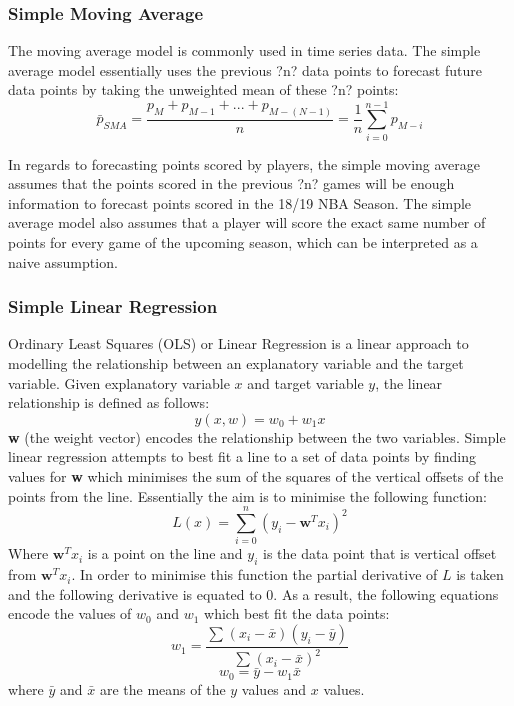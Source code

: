 \documentclass[a4paper,11pt,twoside]{article}
\begin{document}
\subsubsection{Simple Moving Average}
The moving average model is commonly used in time series data. The simple average model essentially uses the previous ?n? data points to forecast future data points by taking the unweighted mean of these ?n? points:
\begin{equation}
\bar{p}_{SMA} = \frac{p_{M} + p_{M-1} + ... + p_{M-(N-1)}} {n} 
= \frac{1}{n} \sum_{i=0}^{n-1}p_{M-i}
\end{equation}

In regards to forecasting points scored by players, the simple moving average assumes that the points scored in the previous ?n? games will be enough information to forecast points scored in the 18/19 NBA Season. The simple average model also assumes that a player will score the exact same number of points for every game of the upcoming season, which can be interpreted as a naive assumption.


\subsubsection{Simple Linear Regression}
Ordinary Least Squares (OLS) or Linear Regression is a linear approach to modelling the relationship between an explanatory variable and the target variable.  Given explanatory variable \(x\) and target variable \(y\), the linear relationship is defined as follows:
\begin{equation}
y(x,w) = w_{0} + w_{1}x
\end{equation}
\textbf{w} (the weight vector) encodes the relationship between the two variables. Simple linear regression attempts to best fit a line to a set of data points by finding values for \textbf{w} which minimises the sum of the squares of the vertical offsets of the points from the line. Essentially the aim is to minimise the following function:
\begin{equation}
L(x) = \sum_{i=0}^{n}(y_{i}-\textbf{w}^Tx_{i})^2
\end{equation}
Where $\textbf{w}^Tx_{i}$ is a point on the line  and \(y_i\) is the data point that is vertical offset from  $\textbf{w}^Tx_{i}$. In order to minimise this function the partial derivative of $L$ is taken and the following derivative is equated to 0. As a result, the following equations encode the values of \(w_{0}\) and \(w_{1}\) which best fit the data points:
\begin{equation}
w_{1} =\frac{\sum{}^{} (x_{i} - \bar{x})(y_{i} - \bar{y})}{\sum{}^{}(x_{i} - \bar{x})^2}
\end{equation}
\begin{equation}
w_{0} = \bar{y} - w_{1}\bar{x}
\end{equation}
where $\bar{y}$ and $\bar{x}$  are the means of the $y$ values and $x$ values.
\end{document}
